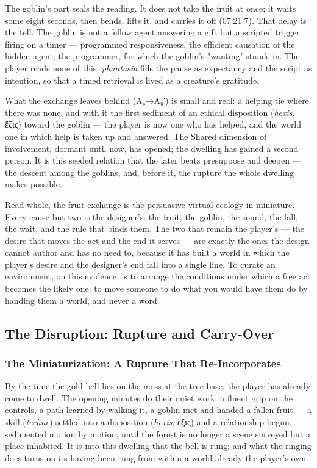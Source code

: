 \documentclass{article}
\newcommand{\gk}[1]{{\greekfont #1}}
\begin{document}
The goblin's part seals the reading. It does not take the fruit at once; it waits some eight seconds, then bends, lifts it, and carries it off (07:21.7). That delay is the tell. The goblin is not a fellow agent answering a gift but a scripted trigger firing on a timer — programmed responsiveness, the efficient causation of the hidden agent, the programmer, for which the goblin's "wanting" stands in. The player reads none of this: \textit{phantasia} fills the pause as expectancy and the script as intention, so that a timed retrieval is lived as a creature's gratitude.

What the exchange leaves behind (A₄→A₀′) is small and real: a helping tie where there was none, and with it the first sediment of an ethical disposition (\textit{hexis}, \gk{ἕξις}) toward the goblin — the player is now one who has helped, and the world one in which help is taken up and answered. The Shared dimension of involvement, dormant until now, has opened; the dwelling has gained a second person. It is this seeded relation that the later beats presuppose and deepen — the descent among the goblins, and, before it, the rupture the whole dwelling makes possible.

Read whole, the fruit exchange is the persuasive virtual ecology in miniature. Every cause but two is the designer's: the fruit, the goblin, the sound, the fall, the wait, and the rule that binds them. The two that remain the player's — the desire that moves the act and the end it serves — are exactly the ones the design cannot author and has no need to, because it has built a world in which the player's desire and the designer's end fall into a single line. To curate an environment, on this evidence, is to arrange the conditions under which a free act becomes the likely one: to move someone to do what you would have them do by handing them a world, and never a word.

\bigskip

\subsection*{The Disruption: Rupture and Carry-Over}

\subsubsection*{The Miniaturization: A Rupture That Re-Incorporates}

By the time the gold bell lies on the moss at the tree-base, the player has already come to dwell. The opening minutes do their quiet work: a fluent grip on the controls, a path learned by walking it, a goblin met and handed a fallen fruit — a skill (\textit{technē}) settled into a disposition (\textit{hexis}, \gk{ἕξις}) and a relationship begun, sedimented motion by motion, until the forest is no longer a scene surveyed but a place inhabited. It is into this dwelling that the bell is rung; and what the ringing does turns on its having been rung from within a world already the player's own.
\end{document}
